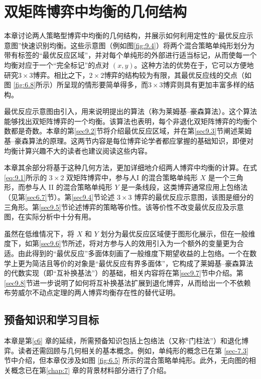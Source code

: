 \chapter{双矩阵博弈中均衡的几何结构}  \label{c9} %

本章讨论两人策略型博弈中均衡的几何结构，并展示如何利用定性的“最优反应示意图”快速识别均衡。这些示意图（例如图\ref{fig:9.4}）将两个混合策略单纯形划分为带有标签的“最优反应区域”，并对每个单纯形的外部进行适当标记，从而使每一个均衡对应于一个“完全标记”的点对 $(x, y)$。这种方法的优势在于，它可以方便地研究$3\times 3$博弈。相比之下，$2\times 2$博弈的结构较为有限，其最优反应线的交点（如图 \ref{fig:6.8}所示）所呈现的情形要简单得多，而$3\times 3$博弈则具有更加丰富多样的结构。


最优反应示意图由\citet{shapley1974}引入，用来说明\citet{lemke1964}提出的算法（称为莱姆基–豪森算法）。这个算法能够找出双矩阵博弈的一个均衡。该算法也表明，每个非退化双矩阵博弈的均衡个数都是奇数。本章的第\ref{sec9.2}节将介绍最优反应区域，并在第\ref{sec9.3}节阐述莱姆基–豪森算法的原理。这两节内容是每位博弈论学者都应掌握的基础知识，即便对均衡计算兴趣不大的读者也建议阅读这些内容。


本章其余部分将基于这种几何方法，更加详细地介绍两人博弈中均衡的计算。在式\eqref{eq:9.1}所示的 \(3 \times  2\) 双矩阵博弈中，参与人I 的混合策略单纯形 \(X\) 是一个三角形，而参与人 II 的混合策略单纯形 \(Y\) 是一条线段，这类博弈通常应用上包络法（见第\ref{sec6.7}节）。第\ref{sec9.4}节论述 \(3 \times  3\) 博弈的最优反应示意图，该图是细分的三角形。第\ref{sec9.5}节论述博弈的策略等价性。该等价性不改变最优反应及示意图，在实际分析中十分有用。


虽然在低维情况下，将 \(X\) 和 \(Y\) 划分为最优反应区域便于图形化展示，但在一般维度下，如第\ref{sec9.6}节所述，将对方参与人的效用引入为一个额外的变量更为合适。由此得到的“最优反应”多面体刻画了一般维度下期望收益的上包络。一个在数学上更为简洁且等价的对象是“最优反应有界多面体”，它构成了莱姆基–豪森算法的代数实现（即“互补换基法”）的基础，相关内容将在第\ref{sec9.7}节中介绍。第\ref{sec9.8}节进一步说明了如何将互补换基法扩展到退化博弈，从而给出一个不依赖布劳威尔不动点定理的两人博弈均衡存在性的替代证明。


\section{预备知识和学习目标}  \label{sec9.1}

本章是第\ref{c6} 章的延续，所需预备知识包括上包络法（又称“门柱法”）和退化博弈。读者还需回顾与几何相关的基本概念。例如，单纯形的概念已在第 \ref{sec-7.3} 节中介绍，但本章仅涉及如图 \ref{fig:6.5} 所示的混合策略单纯形。此外，无向图的相关概念已在第\ref{chap:7} 章的背景材料部分进行了介绍。

